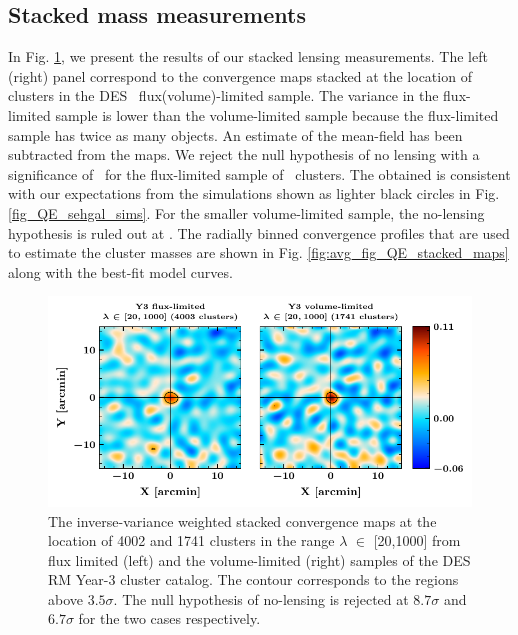 \subsection{Stacked mass measurements}
\label{sec_temp_results}
In Fig. \ref{fig:fig_QE_stacked_maps}, we present the results of our stacked lensing measurements. 
The left (right) panel correspond to the convergence maps stacked at the location of clusters in the DES \whichyear\ flux(volume)-limited sample.
The variance in the flux-limited sample is lower than the volume-limited sample because the flux-limited sample has twice as many objects. 
An estimate of the mean-field has been subtracted from the maps.
We reject the null hypothesis of no lensing with a significance of \howmanysigmaforfullsample\ for the flux-limited sample of \howmanyclustersinfullsample\ clusters. 
The obtained \snr{} is consistent with our expectations from the simulations shown as lighter black circles in Fig. \ref{fig_QE_sehgal_sims}.
For the smaller volume-limited sample, the no-lensing hypothesis is ruled out at  \howmanysigmaforcosmosample.
The radially binned convergence profiles that are used to estimate the cluster masses are shown in Fig. \ref{fig:avg_fig_QE_stacked_maps} along with the best-fit model curves. 
\begin{figure}
\includegraphics[width=\linewidth]{figs/kappa_model_MF_y3_v6_4_22_full_vl_JODY.pdf}
\caption{The inverse-variance weighted stacked convergence maps at the location of 4002 and 1741 clusters in the range $\lambda$ $\in$ [20,1000] from flux limited (left) and the volume-limited (right) samples of the DES RM Year-3 cluster catalog. The contour corresponds to the regions above $3.5 \sigma$. The null hypothesis of no-lensing is rejected at $8.7\sigma$ and $6.7 \sigma $ for the two cases respectively.}
\label{fig:fig_QE_stacked_maps}
\end{figure}

